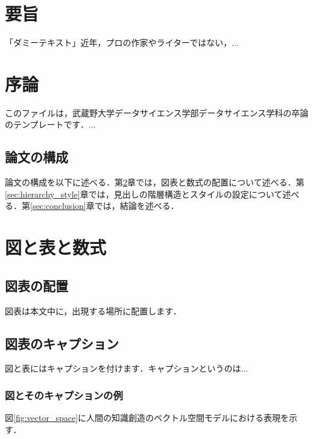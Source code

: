 \documentclass[titlepage,12pt]{ltjsarticle}
\title{卒業論文 \vskip\baselineskip タイトルタイトルタイトル}
\author{武蔵野太郎\\ データサイエンス学科\\ 武蔵野大学}
\date{2025年1月}
\begin{document}
\maketitle

\section*{要旨}
「ダミーテキスト」近年，プロの作家やライターではない，...

\clearpage
\tableofcontents

\section{序論}\label{sec:introduction}
このファイルは，武蔵野大学データサイエンス学部データサイエンス学科の卒論のテンプレートです．...

\subsection{論文の構成}\label{subsec:structure}
論文の構成を以下に述べる．第\ref{sec:figures_tables_equations}章では，図表と数式の配置について述べる．第\ref{sec:hierarchy_style}章では，見出しの階層構造とスタイルの設定について述べる．第\ref{sec:conclusion}章では，結論を述べる．

\section{図と表と数式}\label{sec:figures_tables_equations}
\subsection{図表の配置}\label{subsec:placement}
図表は本文中に，出現する場所に配置します．

\subsection{図表のキャプション}\label{subsec:caption}
図と表にはキャプションを付けます．キャプションというのは...

\subsubsection{図とそのキャプションの例}\label{subsubsec:figure}
図\ref{fig:vector_space}に人間の知識創造のベクトル空間モデルにおける表現を示す．
\end{document}
